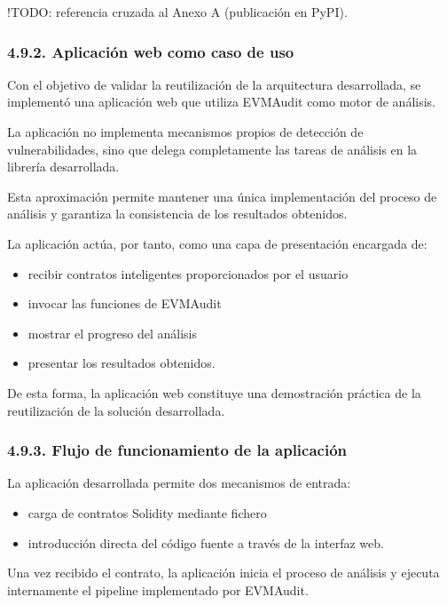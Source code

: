 !TODO: referencia cruzada al Anexo A (publicación en PyPI).

\subsubsection{4.9.2. Aplicación web como caso de
uso}\label{aplicaciuxf3n-web-como-caso-de-uso}

Con el objetivo de validar la reutilización de la arquitectura
desarrollada, se implementó una aplicación web que utiliza EVMAudit como
motor de análisis.

La aplicación no implementa mecanismos propios de detección de
vulnerabilidades, sino que delega completamente las tareas de análisis
en la librería desarrollada.

Esta aproximación permite mantener una única implementación del proceso
de análisis y garantiza la consistencia de los resultados obtenidos.

La aplicación actúa, por tanto, como una capa de presentación encargada
de:

\begin{itemize}
\tightlist
\item
  recibir contratos inteligentes proporcionados por el usuario
\item
  invocar las funciones de EVMAudit
\item
  mostrar el progreso del análisis
\item
  presentar los resultados obtenidos.
\end{itemize}

De esta forma, la aplicación web constituye una demostración práctica de
la reutilización de la solución desarrollada.

\subsubsection{4.9.3. Flujo de funcionamiento de la
aplicación}\label{flujo-de-funcionamiento-de-la-aplicaciuxf3n}

La aplicación desarrollada permite dos mecanismos de entrada:

\begin{itemize}
\tightlist
\item
  carga de contratos Solidity mediante fichero
\item
  introducción directa del código fuente a través de la interfaz web.
\end{itemize}

Una vez recibido el contrato, la aplicación inicia el proceso de
análisis y ejecuta internamente el pipeline implementado por EVMAudit.

